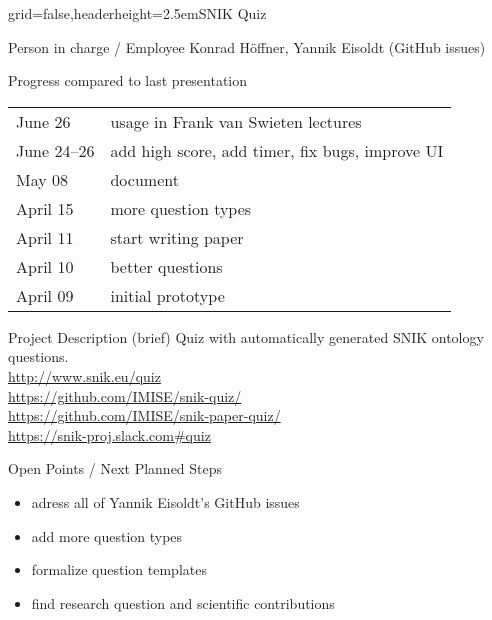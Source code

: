 \documentclass[english]{kiesgrube}
\begin{document}
\begin{poster}{grid=false,headerheight=2.5em}{}{SNIK Quiz}{}{}
\begin{posterbox}[name=person,column=0,row=0]{Person in charge / Employee}
Konrad Höffner, Yannik Eisoldt (GitHub issues) 
\end{posterbox}
\begin{posterbox}[name=progress,below=person]{Progress compared to last presentation}
\begin{tabular}{ll}
June 26		&usage in Frank van Swieten lectures\\
June 24--26	&add high score, add timer, fix bugs, improve UI\\
May 08		&document\\
April 15	&more question types\\
April 11	&start writing paper\\
April 10	&better questions\\
April 09	&initial prototype\\
\end{tabular}
\end{posterbox}
\begin{posterbox}[name=description,below=progress]{Project Description (brief)}
Quiz with automatically generated SNIK ontology questions.\\
\url{http://www.snik.eu/quiz}\\
\url{https://github.com/IMISE/snik-quiz/}\\
\url{https://github.com/IMISE/snik-paper-quiz/}\\
\url{https://snik-proj.slack.com#quiz}
\end{posterbox}
\begin{posterbox}[name=open,column=1,row=0]{Open Points / Next Planned Steps}
\begin{itemize}
\item adress all of Yannik Eisoldt's GitHub issues
\item add more question types
\item formalize question templates
\item find research question and scientific contributions

\end{itemize}
\end{posterbox}
\end{poster}
\end{document}
